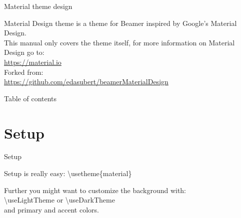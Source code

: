 \documentclass[aspectratio=1610,dvipsnames, noamsthm]{beamer}
\begin{document}
\usePrimaryPink
\useAccentLime

{
  \begin{frame}
    \titlepage
  \end{frame}
}


\usePrimaryAmber
\useAccentPink



\begin{frame}{Material theme design}
  \begin{card}
    {\color{accent}Material Design theme} is a theme for Beamer inspired by Google's Material Design. \\[5mm]
    This manual only covers the theme itself, for more information on Material Design go to:
    \\\url{https://material.io}
    \\
    {\color{accent}Forked from:\\
    \url{https://github.com/edasubert/beamerMaterialDesign}}
  \end{card}
\end{frame}




\usePrimaryBlueGrey
\useAccentAmber


\begin{frame}{Table of contents}
  \begin{card}
    \tableofcontents
  \end{card}
\end{frame}







\usePrimaryTeal
\useAccentBlueGrey


\section{Setup}
\begin{frame}{Setup}
  \begin{card}
    Setup is really easy:
    {\color{accent}\textbackslash usetheme\{material\}}
  \end{card}
  \begin{card}
    Further you might want to customize the background with: \\[2mm]
    {\color{accent}\textbackslash useLightTheme} or {\color{accent}\textbackslash useDarkTheme} \\[2mm]
    and primary and accent colors.
  \end{card}
\end{frame}
\end{document}
